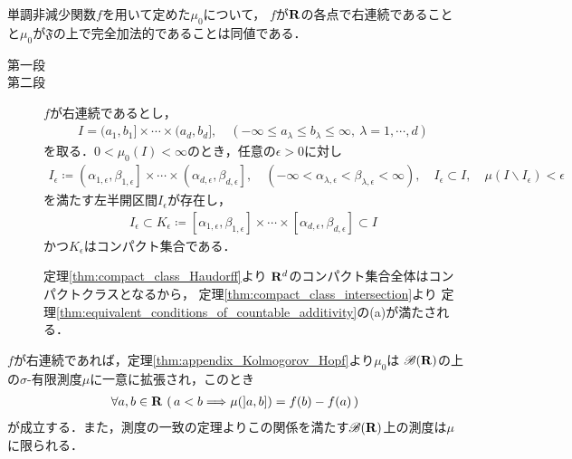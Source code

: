	\begin{screen}
		\begin{thm}[右連続性と完全加法性]
			単調非減少関数$f$を用いて定めた$\mu_0$について，
			$f$が$\mathbf{R}$の各点で右連続であることと$\mu_0$が$\mathfrak{F}$の上で完全加法的であることは同値である．
		\end{thm}
	\end{screen}
	
	\begin{prf}\mbox{}
		\begin{description}
			\item[第一段]
				
			\item[第二段]
				$f$が右連続であるとし，
				\begin{align}
					I = (a_1,b_1] \times \cdots \times (a_d,b_d],
					\quad (-\infty \leq a_\lambda \leq b_\lambda \leq \infty,\ 
					\lambda = 1,\cdots,d)
				\end{align}
				を取る．$0 < \mu_0(I) < \infty$のとき，任意の$\epsilon > 0$に対し
				\begin{align}
					I_\epsilon \coloneqq 
					\left(\alpha_{1,\epsilon},\beta_{1,\epsilon}\right]
					\times \cdots \times
					\left(\alpha_{d,\epsilon},\beta_{d,\epsilon}\right],
					\quad (-\infty < \alpha_{\lambda,\epsilon} < \beta_{\lambda,\epsilon} < \infty),
					\quad I_\epsilon \subset I,
					\quad \mu(I \backslash I_\epsilon) < \epsilon
				\end{align}
				を満たす左半開区間$I_\epsilon$が存在し，
				\begin{align}
					I_\epsilon \subset 
					K_\epsilon \coloneqq \left[\alpha_{1,\epsilon},\beta_{1,\epsilon}\right]
					\times \cdots \times
					\left[\alpha_{d,\epsilon},\beta_{d,\epsilon}\right]
					\subset I
				\end{align}
				かつ$K_\epsilon$はコンパクト集合である．
				
				定理\ref{thm:compact_class_Haudorff}より
				$\mathbf{R}^d$のコンパクト集合全体はコンパクトクラスとなるから，
				定理\ref{thm:compact_class_intersection}より
				定理\ref{thm:equivalent_conditions_of_countable_additivity}の(a)が満たされる．
		\end{description}
	\end{prf}
	
	$f$が右連続であれば，定理\ref{thm:appendix_Kolmogorov_Hopf}より$\mu_0$は
	$\mathscr{B}(\mathbf{R})$の上の$\sigma$-有限測度$\mu$に一意に拡張され，このとき
	\begin{align}
		\forall a,b \in \mathbf{R}\, \left(\, a < b \Longrightarrow \mu(]a,b]) = f(b) - f(a)\, \right)
	\end{align}
	が成立する．また，測度の一致の定理よりこの関係を満たす$\mathscr{B}(\mathbf{R})$上の測度は$\mu$に限られる．
	
